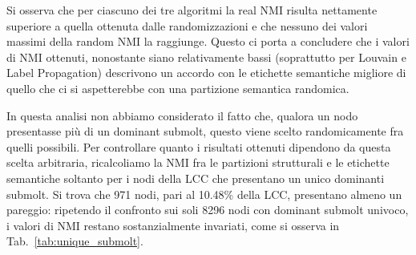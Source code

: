 \documentclass[twocolumn]{article}
\begin{document}
   \begin{table}[htb]
      \centering
      \caption{Confronto tra la NMI osservata e la media ottenuta dal semantic null model.}
      \label{tab:null_model}
   \end{table}

   Si osserva che per ciascuno dei tre algoritmi la real NMI risulta nettamente superiore a quella ottenuta dalle randomizzazioni e che nessuno dei valori massimi della random NMI la raggiunge. Questo ci porta a concludere che i valori di NMI ottenuti, nonostante siano relativamente bassi (soprattutto per Louvain e Label Propagation) descrivono un accordo con le etichette semantiche migliore di quello che ci si aspetterebbe con una partizione semantica randomica.

   In questa analisi non abbiamo considerato il fatto che, qualora un nodo presentasse più di un dominant submolt, questo viene scelto randomicamente fra quelli possibili. Per controllare quanto i risultati ottenuti dipendono da questa scelta arbitraria, ricalcoliamo la NMI fra le partizioni strutturali e le etichette semantiche soltanto per i nodi della LCC che presentano un unico dominanti submolt. 
   Si trova che 971 nodi, pari al 10.48\% della LCC, presentano almeno un pareggio: ripetendo il confronto sui soli 8296 nodi con dominant submolt univoco, i valori di NMI restano sostanzialmente invariati, come si osserva in Tab.~\ref{tab:unique_submolt}. 

   \begin{table}[htb]
      \centering
      \caption{Confronto tra la NMI reale e quella ottenuta considerando solo i nodi con dominant submolt univoco.}
      \label{tab:unique_submolt}
   \end{table}
\end{document}
